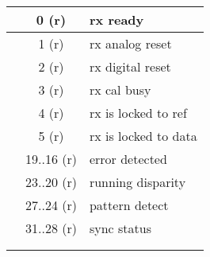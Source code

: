 \documentclass[landscape,margin=3pt,pstricks]{standalone}
\begin{document}
\begin{tabular}{|c|c|*{32}{c|}}
 & 0 (r) &  \multicolumn{32}{|l|}{rx ready} \\ \hline
 & 1 (r) &  \multicolumn{32}{|l|}{rx analog reset} \\ \hline
 & 2 (r) &  \multicolumn{32}{|l|}{rx digital reset} \\ \hline
 & 3 (r) &  \multicolumn{32}{|l|}{rx cal busy} \\ \hline
 & 4 (r) &  \multicolumn{32}{|l|}{rx is locked to ref} \\ \hline
 & 5 (r) &  \multicolumn{32}{|l|}{rx is locked to data} \\ \hline
 & 19..16 (r) &  \multicolumn{32}{|l|}{error detected} \\ \hline
 & 23..20 (r) &  \multicolumn{32}{|l|}{running disparity} \\ \hline
 & 27..24 (r) &  \multicolumn{32}{|l|}{pattern detect} \\ \hline
 & 31..28 (r) &  \multicolumn{32}{|l|}{sync status} \\ \hline
 &  &  \multicolumn{32}{|l|}{} \\ \hline
 &  &  \multicolumn{32}{|l|}{} \\ \hline
  \hline
\end{tabular}
\end{document}

